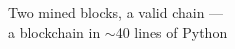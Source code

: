 \documentclass[preview]{standalone}
\begin{document}
\begin{center}
Two mined blocks, a valid chain ---\\a blockchain in $\sim$40 lines of Python
\end{center}
\end{document}
